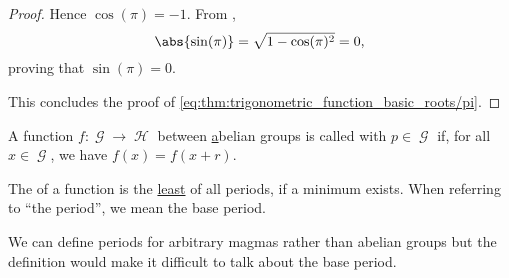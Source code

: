 \begin{proof}
  Hence \( \cos(\pi) = -1 \). From ,
  \begin{equation*}
    \abs{\sin(\pi)} = \sqrt{1 - \cos(\pi)^2} = 0,
  \end{equation*}
  proving that \( \sin(\pi) = 0 \).

  This concludes the proof of \eqref{eq:thm:trigonometric_function_basic_roots/pi}.
\end{proof}

\begin{definition}\label{def:periodic_function}
  A function \( f: \mscrG \to \mscrH \) between \hyperref[def:abelian_group] abelian groups is called  with  \( p \in \mscrG \) if, for all \( x \in \mscrG \), we have \( f(x) = f(x + r) \).

  The  of a function is the \hyperref[def:preordered_set/maximum_and_minimum]{least} of all periods, if a minimum exists. When referring to \enquote{the period}, we mean the base period.

  We can define periods for arbitrary magmas rather than abelian groups but the definition would make it difficult to talk about the base period.
\end{definition}

